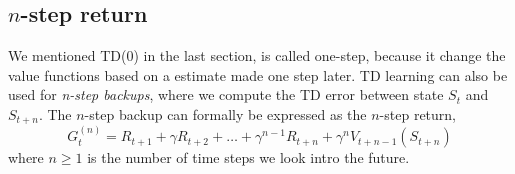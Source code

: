 \documentclass[11pt]{article}
\begin{document}
\subsection{$n$-step return}
We mentioned TD(0) in the last section, is called one-step, because it change the value functions based on a estimate made one step later. TD learning can also be used for \textit{n-step backups}, where we compute the TD error between state $S_{t}$ and $S_{t + n}$. The $n$-step backup can formally be expressed as the $n$-step return,
\begin{equation}
    G_{t}^{(n)} = R_{t + 1} + \gamma R_{t + 2} + \dots + \gamma^{n - 1} R_{t + n} + \gamma^{n} V_{t + n - 1}(S_{t + n})
\end{equation}
where $n \geq 1$ is the number of time steps we look intro the future.
\end{document}
